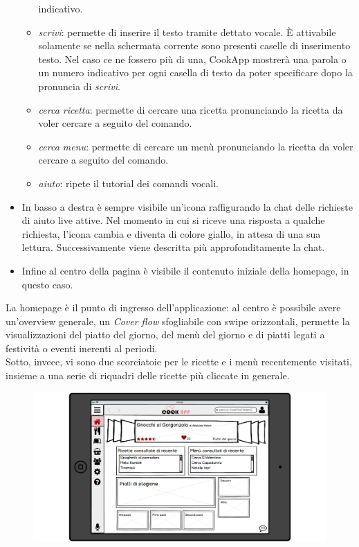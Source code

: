 \begin{itemize}
\begin{itemize}
indicativo.
	\item \emph{scrivi}: permette di inserire il testo tramite dettato
vocale. È attivabile solamente se nella schermata corrente sono presenti
caselle di inserimento testo. Nel caso ce ne fossero più di una, CookApp
mostrerà una parola o un numero indicativo per ogni casella di testo da
poter specificare dopo la pronuncia di \emph{scrivi}.
	\item \emph{cerca ricetta}: permette di cercare una ricetta
pronunciando la ricetta da voler cercare a seguito del comando.
	\item \emph{cerca menu}: permette di cercare un menù
pronunciando la ricetta da voler cercare a seguito del comando.
	\item \emph{aiuto}: ripete il tutorial dei comandi vocali. 
\end{itemize}

\item In basso a destra è sempre visibile un'icona raffigurando la chat delle richieste di aiuto live attive. Nel momento in cui si riceve una risposta a qualche richiesta, l'icona cambia e diventa di colore giallo, in attesa di una sua lettura. Successivamente viene descritta più approfonditamente la chat.
\item Infine al centro della pagina è visibile il contenuto iniziale della homepage, in questo caso.
\end{itemize}
La homepage è il punto di ingresso dell'applicazione: al centro è possibile avere un'overview generale, un \textit{Cover flow} sfogliabile con swipe orizzontali, permette la visualizzazioni del piatto del giorno, del menù del giorno e di piatti legati a festività o eventi inerenti al periodi.\\
Sotto, invece, vi sono due scorciatoie per le ricette e i menù recentemente visitati, insieme a una serie di riquadri delle ricette più cliccate in generale.
\begin{figure}[H]
	\centering
	\includegraphics[width=0.95\linewidth]{img/mockup/Homepage.png}
\end{figure}
